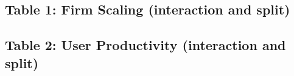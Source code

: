 \documentclass{article}
\newcommand{\cleanedresultsdir}{../results/cleaned/tex}
\newcommand{\TableInput}[2][\linewidth]{}
\begin{document}
\subsection*{Table 1: Firm Scaling (interaction and split)}
\begin{table}[H]
  \centering
  \TableInput{\cleanedresultsdir/firm_scaling_llm_equity_heterogeneity_observed.tex}
\end{table}

\subsection*{Table 2: User Productivity (interaction and split)}
\begin{table}[H]
  \centering
  \TableInput{\cleanedresultsdir/user_productivity_llm_equity_heterogeneity_observed_precovid.tex}
\end{table}
\end{document}
